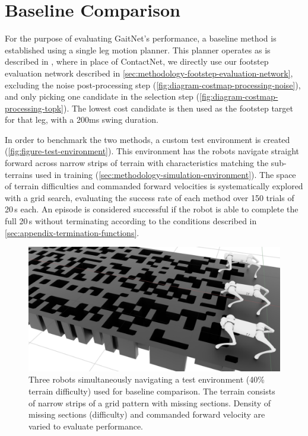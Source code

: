 \section{Baseline Comparison}
\label{sec:results-baseline-comparison}

For the purpose of evaluating GaitNet's performance, a baseline
method is established using a single leg motion planner. This planner
operates as is described in \cite{bratta_contactnet_2024}, where in
place of ContactNet, we directly use our footstep evaluation network
described in \autoref{sec:methodology-footstep-evaluation-network},
excluding the noise post-processing step
(\autoref{fig:diagram-costmap-processing-noise}), and only picking
one candidate in the selection step
(\autoref{fig:diagram-costmap-processing-topk}). The lowest cost
candidate is then used as the footstep target for that leg, with a
200ms swing duration.

In order to benchmark the two methods, a custom test environment is
created (\autoref{fig:figure-test-environment}). This environment has
the robots navigate straight forward across narrow strips of terrain
with characteristics matching the sub-terrains used in training
(\autoref{sec:methodology-simulation-environment}).  The space of
terrain difficulties and commanded forward velocities is
systematically explored with a grid search, evaluating the success
rate of each method over 150 trials of 20\,s each. An episode is
considered successful if the robot is able to complete the full 20\,s
without terminating according to the conditions described in
\autoref{sec:appendix-termination-functions}.

\begin{figure}[H]
  \centering
  \includegraphics[width=\textwidth]{images/figures/test-environment.png}
  \caption{Three robots simultaneously navigating a test environment
    (40\% terrain difficulty) used for baseline comparison. The terrain
    consists of narrow strips of a grid pattern with missing sections.
    Density of missing sections (difficulty) and commanded forward
  velocity are varied to evaluate performance.}
  \label{fig:figure-test-environment}
\end{figure}

